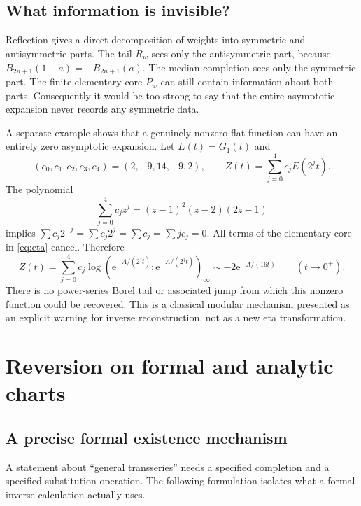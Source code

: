 \documentclass[11pt,a4paper]{article}
\numberwithin{equation}{section}
\theoremstyle{definition}
\theoremstyle{remark}
\newcommand{\e}{\mathrm e}
\newcommand{\wt}{\widetilde}
\begin{document}
\subsection{What information is invisible?}
Reflection gives a direct decomposition of weights into symmetric and
antisymmetric parts. The tail $\wt R_w$ sees only the antisymmetric
part, because $B_{2n+1}(1-a)=-B_{2n+1}(a)$. The median completion sees
only the symmetric part. The finite elementary core $P_w$ can still
contain information about both parts. Consequently it would be too
strong to say that the entire asymptotic expansion never records any
symmetric data.

A separate example shows that a genuinely nonzero flat function can
have an entirely zero asymptotic expansion. Let $E(t)=G_1(t)$ and
\begin{equation}
 (c_0,c_1,c_2,c_3,c_4)=(2,-9,14,-9,2),\qquad
 Z(t)=\sum_{j=0}^4c_jE(2^jt).
 \label{eq:eta-flat}
\end{equation}
The polynomial
\[
 \sum_{j=0}^4c_jz^j=(z-1)^2(z-2)(2z-1)
\]
implies $\sum c_j2^{-j}=\sum c_j2^j=\sum c_j=\sum jc_j=0$.
All terms of the elementary core in \eqref{eq:eta} cancel. Therefore
\begin{equation}
 Z(t)=\sum_{j=0}^4c_j
       \log(\e^{-A/(2^jt)};\e^{-A/(2^jt)})_\infty
 \sim-2\e^{-A/(16t)}\qquad(t\to0^+).
 \label{eq:eta-flat-asymptotic}
\end{equation}
There is no power-series Borel tail or associated jump from which this
nonzero function could be recovered. This is a classical modular
mechanism presented as an explicit warning for inverse reconstruction,
not as a new eta transformation.

\section{Reversion on formal and analytic charts}
\label{sec:inverse}

\subsection{A precise formal existence mechanism}
A statement about ``general transseries'' needs a specified completion
and a specified substitution operation. The following formulation
isolates what a formal inverse calculation actually uses.
\end{document}
